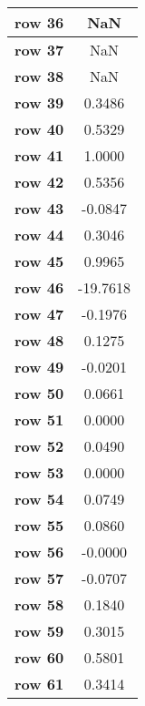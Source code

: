 \begin{tiny}
\begin{tabular}{|l|c|}
\textbf{row 36}&NaN\\\hline
\textbf{row 37}&NaN\\\hline
\textbf{row 38}&NaN\\\hline
\textbf{row 39}&0.3486\\\hline
\textbf{row 40}&0.5329\\\hline
\textbf{row 41}&1.0000\\\hline
\textbf{row 42}&0.5356\\\hline
\textbf{row 43}&-0.0847\\\hline
\textbf{row 44}&0.3046\\\hline
\textbf{row 45}&0.9965\\\hline
\textbf{row 46}&-19.7618\\\hline
\textbf{row 47}&-0.1976\\\hline
\textbf{row 48}&0.1275\\\hline
\textbf{row 49}&-0.0201\\\hline
\textbf{row 50}&0.0661\\\hline
\textbf{row 51}&0.0000\\\hline
\textbf{row 52}&0.0490\\\hline
\textbf{row 53}&0.0000\\\hline
\textbf{row 54}&0.0749\\\hline
\textbf{row 55}&0.0860\\\hline
\textbf{row 56}&-0.0000\\\hline
\textbf{row 57}&-0.0707\\\hline
\textbf{row 58}&0.1840\\\hline
\textbf{row 59}&0.3015\\\hline
\textbf{row 60}&0.5801\\\hline
\textbf{row 61}&0.3414\\\hline
\end{tabular}
\end{tiny}